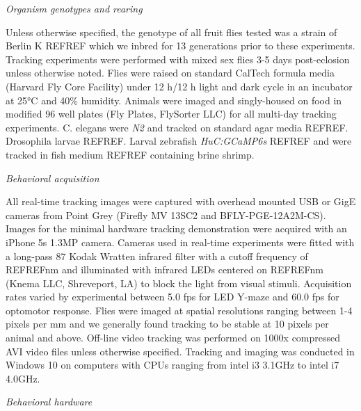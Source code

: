\documentclass[10pt]{article}
\begin{document}
\begin{multicols}{2}
\vspace*{0.5cm}
\noindent\textit{Organism genotypes and rearing}
\vspace*{0.3cm}

Unless otherwise specified, the genotype of all fruit flies tested was a strain of Berlin K REFREF which we inbred for 13 generations prior to these experiments. Tracking experiments were performed with mixed sex flies 3-5 days post-eclosion unless otherwise noted. Flies were raised on standard CalTech formula media (Harvard Fly Core Facility) under 12 h/12 h light and dark cycle in an incubator at 25°C and 40\% humidity. Animals were imaged and singly-housed on food in modified 96 well plates (Fly Plates, FlySorter LLC) for all multi-day tracking experiments. C. elegans were \textit{N2} and tracked on standard agar media REFREF. Drosophila larvae REFREF. Larval zebrafish \textit{HuC:GCaMP6s} REFREF and were tracked in fish medium REFREF containing brine shrimp.

\vspace*{0.5cm}
\noindent\textit{Behavioral acquisition}
\vspace*{0.3cm}

All real-time tracking images were captured with overhead mounted USB or GigE cameras from Point Grey (Firefly MV 13SC2 and BFLY-PGE-12A2M-CS). Images for the minimal hardware tracking demonstration were acquired with an iPhone 5s 1.3MP camera. Cameras used in real-time experiments were fitted with a long-pass 87 Kodak Wratten infrared filter with a cutoff frequency of REFREFnm and illuminated with infrared LEDs centered on REFREFnm (Knema LLC, Shreveport, LA) to block the light from visual stimuli. Acquisition rates varied by experimental between 5.0 fps for LED Y-maze and 60.0 fps for optomotor response. Flies were imaged at spatial resolutions ranging between 1-4 pixels per mm and we generally found tracking to be stable at 10 pixels per animal and above.  Off-line video tracking was performed on 1000x compressed AVI video files unless otherwise specified. Tracking and imaging was conducted in Windows 10 on computers with CPUs ranging from intel i3 3.1GHz to intel i7 4.0GHz. 

\vspace*{0.5cm}
\noindent\textit{Behavioral hardware}
\vspace*{0.3cm}


\end{multicols}
\end{document}
